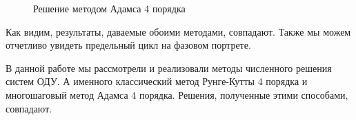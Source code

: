 		
		\newpage
		\thispagestyle{empty}
		\begin{landscape}
			\begin{figure}[h!]
				\begin{minipage}[h]{0.55\linewidth}
				\end{minipage}
				\hfill
				\begin{minipage}[h]{0.55\linewidth}
				\end{minipage}
				\caption{Решение методом Адамса 4 порядка}
			\end{figure}
			\fillandplacepagenumber
		\end{landscape}
	
		
		\restoregeometry
		\newpage
		Как видим, результаты, даваемые обоими методами, совпадают. Также мы можем отчетливо увидеть предельный цикл на фазовом портрете.
	
		В данной работе мы рассмотрели и реализовали методы численного решения систем ОДУ. А именного классический метод Рунге-Кутты 4 порядка и многошаговый метод Адамса 4 порядка. Решения, полученные этими способами, совпадают.
		
		
